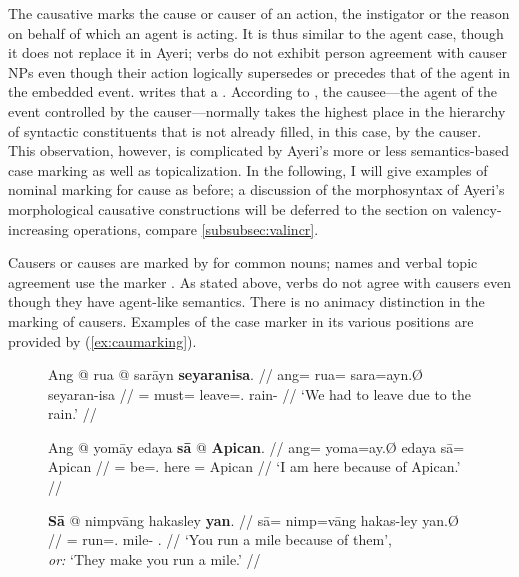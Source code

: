 The causative marks the cause or causer of an action, the instigator or the
reason on behalf of which an agent is acting. It is thus similar to the agent
case, though it does not replace it in Ayeri; verbs do not exhibit person
agreement with causer NPs even though their action logically supersedes or
precedes that of the agent in the embedded event. \citet{dixon2000} writes that
a .
According to \citet[176]{comrie1989}, the causee---the agent of the event
controlled by the causer---normally takes the highest place in the hierarchy of
syntactic constituents that is not already filled, in this case, by the causer.
This observation, however, is complicated by Ayeri's more or less
semantics-based case marking as well as topicalization. In the following, I
will give examples of nominal marking for cause as before; a discussion of the
morphosyntax of Ayeri's morphological causative constructions will be deferred
to the section on valency-increasing operations, compare
\autoref{subsubsec:valincr}.

Causers or causes are marked by  for common nouns; names and
verbal topic agreement use the marker . As stated above, verbs do
not agree with causers even though they have agent-like semantics. There is no
animacy distinction in the marking of causers. Examples of the case marker in
its various positions are provided by (\ref{ex:caumarking}).

\begin{figure}[h]
\pex\label{ex:caumarking}
\a\begingl
	\gla Ang @ rua @ sarāyn \textbf{seyaranisa}. //
	\glb ang= rua= sara=ayn.Ø seyaran-isa //
	\glc \AgtT{}= must= leave=\Fpl{}.\Top{} rain-\Caus{} //
	\glft `We had to leave due to the rain.' //
\endgl

\a\begingl
	\gla Ang @ yomāy edaya \textbf{sā} @ \textbf{Apican}. //
	\glb ang= yoma=ay.Ø edaya sā= Apican //
	\glc \AgtT{}= be=\Fsg{}.\Top{} here \Caus{}= Apican //
	\glft `I am here because of Apican.' //
\endgl

\a\label{ex:caustop}\begingl
	\gla \textbf{Sā} @ nimpvāng hakasley \textbf{yan}. //
	\glb sā= nimp=vāng hakas-ley yan.Ø //
	\glc \CauT{}= run=\Second{}.\Aarg{} mile-\PargI{} \TplM{}.\Top{} //
	\glft `You run a mile because of them',\\
		\textit{or:} `They make you run a mile.' //
\endgl
\xe
\end{figure}

